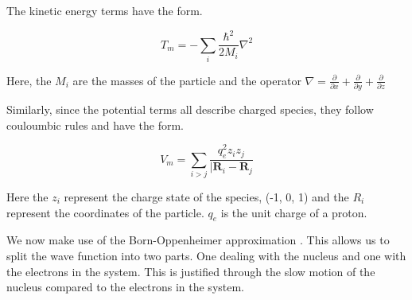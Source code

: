 The kinetic energy terms have the form.

\begin {equation}
T_m = - \sum_i \frac{\hbar^2}{2M_i} \nabla^2
\end {equation}

Here, the $M_i$ are the masses of the particle and the operator $\nabla = \frac{\partial}{\partial x} + \frac{\partial }{\partial y} + \frac{\partial}{\partial z} $

Similarly, since the potential terms all describe charged species, they follow couloumbic rules and have the form.

\begin{equation}
	V_m = \sum_{i>j} \frac{q_e^2 z_i z_j }{|\textbf{R}_i-\textbf{R}_j}
\end{equation}

Here the $z_i$ represent the charge state of the species, (-1, 0, 1) and the $R_i$ represent the coordinates of the particle. $q_e$ is the unit charge of a proton.

We now make use of the Born-Oppenheimer approximation \cite{Born1927}. This allows us to split the wave function into two parts. One dealing with the nucleus and one with the electrons in the system. This is justified through the slow motion of the nucleus compared to the electrons in the system.
